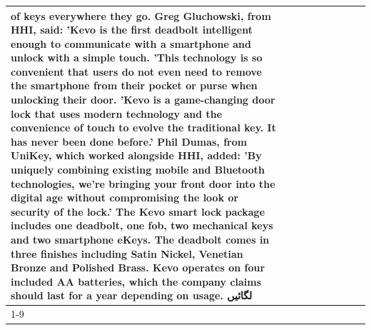 \begin{table}[H]
\begin{tabular}{lllrlllll}
of keys everywhere they go. Greg Gluchowski, from HHI, said: 'Kevo is the first deadbolt intelligent enough to communicate with a smartphone and unlock with a simple touch. 'This technology is so convenient that users do not even need to remove the smartphone from their pocket or purse when unlocking their door. 'Kevo is a game-changing door lock that uses modern technology and the convenience of touch to evolve the traditional key. It has never been done before.' Phil Dumas, from UniKey, which worked alongside HHI, added: 'By uniquely combining existing mobile and Bluetooth technologies, we’re bringing your front door into the digital age without compromising the look or security of the lock.' The Kevo smart lock package includes one deadbolt, one fob, two mechanical keys and two smartphone eKeys. The deadbolt comes in three finishes including Satin Nickel, Venetian Bronze and Polished Brass. Kevo operates on four included AA batteries, which the company claims should last for a year depending on usage. لگائیں \\
\cline{1-9}

\end{tabular}
\end{table}
